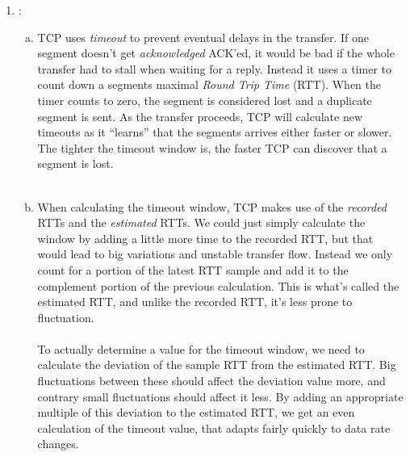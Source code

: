 \documentclass[a4paper,9pt,fleqn]{article}
\begin{document}
\begin{enumerate}[{Task} 1]
\item :
\begin{enumerate}[a)]
\item 
TCP uses {\it timeout} to prevent eventual delays in the transfer. If one segment doesn't get
{\it acknowledged} {ACK'ed}, it would be bad if the whole transfer had to stall when waiting
for a reply. Instead it uses a timer to count down a segments maximal {\it Round Trip Time}
(RTT). When the timer counts to zero, the segment is considered lost and a duplicate segment
is sent. As the transfer proceeds, TCP will calculate new timeouts as it ``learns'' that 
the segments arrives either faster or slower. The tighter the timeout window is, the faster
TCP can discover that a segment is lost.   
\\
\\
\item 
When calculating the timeout window, TCP makes use of the {\it recorded} RTTs and the
{\it estimated} RTTs. We could just simply calculate the window by adding a little more
time to the recorded RTT, but that would lead to big variations and unstable transfer
flow. Instead we only count for a portion of the latest RTT sample and add it to the
complement portion of the previous calculation. This is what's called the estimated
RTT, and unlike the recorded RTT, it's less prone to fluctuation.
\\
\\
To actually determine a value for the timeout window, we need to calculate the deviation
of the sample RTT from the estimated RTT. Big fluctuations between these should affect
the deviation value more, and contrary small fluctuations should affect it less. By adding
an appropriate multiple of this deviation to the estimated RTT, we get an even calculation
of the timeout value, that adapts fairly quickly to data rate changes.  
\end{enumerate}

\end{enumerate}
\end{document}
